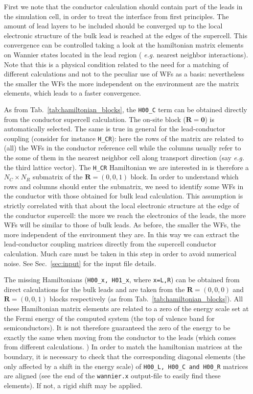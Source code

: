First we note that the conductor calculation should contain part
of the leads in the simulation cell, in order to treat the
interface from first principles. The amount of lead layers to be
included should be converged up to the local electronic structure
of the bulk lead is reached at the edges of the supercell. This
convergence can be controlled taking a look at the hamiltonian
matrix elements on Wannier states located in the lead region ({\it
e.g.} nearest neighbor interactions). Note that this is a physical
condition related to the need for a matching of different
calculations and not to the peculiar use of WFs as a basis:
nevertheless the smaller the WFs the more independent on the
environment are the matrix elements, which leads to a faster
convergence.

As from Tab.~\ref{tab:hamiltonian_blocks}, the {\tt H00\_C} term
can be obtained directly from the conductor supercell calculation.
The on-site block ($\mathbf{R}=\mathbf{0}$) is automatically
selected. The same is true in general for the lead-conductor
coupling (consider for instance {\tt H\_CR}): here the rows of the
matrix are related to (all) the WFs in the conductor reference
cell while the columns usually refer to the some of them in the
nearest neighbor cell along transport direction (say {\it e.g.}
the third lattice vector). The {\tt H\_CR} Hamiltonian we are
interested in is therefore a $N_C \times N_R$ submatrix of the
$\mathbf{R}=(0,0,1)$ block. In order to understand which rows and
columns should enter the submatrix, we need to identify some WFs
in the conductor with those obtained for bulk lead calculation.
This assumption is strictly correlated with that about the local
electronic structure at the edge of the conductor supercell: the
more we reach the electronics of the leads, the more WFs will be
similar to those of bulk leads. As before, the smaller the WFs,
the more independent of the environment they are. In this way we
can extract the lead-conductor coupling matrices directly from the
supercell conductor calculation. Much care must be taken in this
step in order to avoid numerical noise. See Sec.~\ref{sec:input}
for the input file details.

The missing Hamiltonians ({\tt H00\_x, H01\_x}, where {\tt x=L,R})
can be obtained from direct calculations for the bulk leads and
are taken from the $\mathbf{R}=(0,0,0)$ and $\mathbf{R}=(0,0,1)$
blocks respectively (as from Tab.~\ref{tab:hamiltonian_blocks}).
All these Hamiltonian matrix elements are related to a zero of the
energy scale set at the Fermi energy of the computed system (the
top of valence band for semiconductors). It is not therefore
guaranteed the zero of the energy to be exactly the same when
moving from the conductor to the leads (which comes from different
calculations. ) In order to match the hamiltonian matrices at the
boundary, it is necessary to check that the corresponding diagonal
elements (the only affected by a shift in the energy scale) of
{\tt H00\_L, H00\_C and H00\_R} matrices are aligned (see the end
of the {\tt wannier.x} output-file to easily find these elements).
If not, a rigid shift may be applied.

